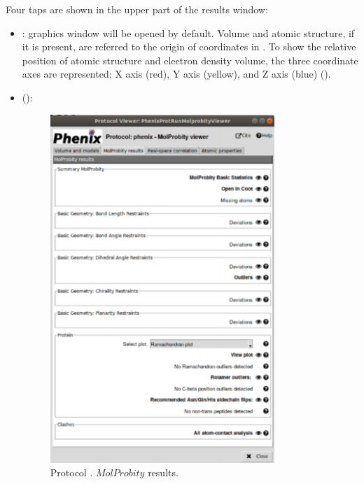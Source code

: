 \begin{itemize}
   Four taps are shown in the upper part of the results window:
   \begin{itemize}
     \item {}: \chimera graphics window will be opened by default. Volume and atomic structure, if it is present, are referred to the origin of coordinates in \chimera. To show the relative position of atomic structure and electron density volume, the three coordinate axes are represented; X axis (red), Y axis (yellow), and Z axis (blue) ().\\
     \item {} ():
        \begin{figure}[H]
         \centering 
         \captionsetup{width=.7\linewidth} 
         \includegraphics[width=0.80\textwidth]{Images_appendix/Fig145.pdf}
         \caption{Protocol . $MolProbity$ results.}
         \label{fig:app_protocol_molprobity_3}
        \end{figure}
        

\end{itemize}
\end{itemize}
